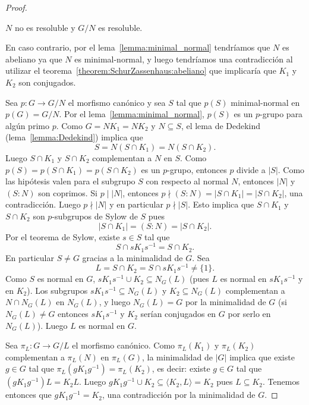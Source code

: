 \begin{proof}
	\begin{claim}
		$N$ no es resoluble y $G/N$ es resoluble. 
	\end{claim}
	
	En caso contrario, por el lema~\ref{lemma:minimal_normal} tendríamos que
	$N$ es abeliano ya que $N$ es minimal-normal, y luego tendríamos una
	contradicción al utilizar el teorema~\ref{theorem:SchurZassenhaus:abeliano}
	que implicaría que $K_1$ y $K_2$ son conjugados.

	\medskip
	Sea $p\colon G\to G/N$ el morfismo canónico y sea $S$ tal que $p(S)$
	minimal-normal en $p(G)=G/N$.  Por el lema~\ref{lemma:minimal_normal},
	$p(S)$ es un $p$-grupo para algún primo $p$.  Como $G=NK_1=NK_2$ y $N\subseteq
	S$, el lema de Dedekind (lema~\ref{lemma:Dedekind}) implica que
	\[
	S=N(S\cap K_1)=N(S\cap K_2).
	\]
	Luego $S\cap K_1$ y $S\cap K_2$
	complementan a $N$ en $S$. Como $p(S)=p(S\cap K_1)=p(S\cap K_2)$ es un $p$-grupo,
	entonces $p$ divide a $|S|$. Como las hipótesis valen para el subgrupo $S$ con respecto al normal $N$,
	entonces $|N|$ y $(S:N)$ son coprimos. Si $p\mid |N|$, entonces 
	$p\nmid (S:N)=|S\cap K_1|=|S\cap K_2|$, una contradicción. Luego $p\nmid |N|$ y 
	en particular $p\nmid |S|$. Esto implica que $S\cap K_1$ y $S\cap K_2$ son
	$p$-subgrupos de Sylow de $S$ pues 
	\[
		|S\cap K_1|=(S:N)=|S\cap K_2|.
	\]
	Por el teorema de Sylow, existe $s\in
	S$ tal que \[
	S\cap sK_1s^{-1}=S\cap K_2.
	\]
	En particular $S\ne G$ gracias a la minimalidad de $G$.
	Sea 
	\[
		L=S\cap K_2=S\cap sK_1s^{-1}\ne\{1\}.
	\]
	Como $S$ es normal en $G$, $sK_1s^{-1}\cup K_2\subseteq N_G(L)$ (pues $L$
	es normal en $sK_1s^{-1}$ y en $K_2$). Los subgrupos $sK_1s^{-1}\subseteq
	N_G(L)$ y $K_2\subseteq N_G(L)$ complementan a $N\cap N_G(L)$ en $N_G(L)$, y luego
	$N_G(L)=G$ por la minimalidad de $G$ (si $N_G(L)\ne G$ entonces
	$sK_1s^{-1}$ y $K_2$ serían conjugados en $G$ por serlo en $N_G(L)$). Luego
	$L$ es normal en $G$. 
	
	Sea $\pi_L\colon G\to G/L$ el morfismo canónico. Como
	$\pi_L(K_1)$ y $\pi_L(K_2)$ complementan a $\pi_L(N)$ en $\pi_L(G)$, la minimalidad
	de $|G|$ implica que existe $g\in G$ tal que $\pi_L(gK_1g^{-1})=\pi_L(K_2)$, es
	decir: existe $g\in G$ tal que $(gK_1g^{-1})L=K_2L$.  Luego $gK_1g^{-1}\cup
	K_2\subseteq \langle K_2,L\rangle=K_2$ pues $L\subseteq K_2$. Tenemos entonces que
	$gK_1g^{-1}=K_2$, una contradicción por la minimalidad de $G$. 
%
\end{proof}



